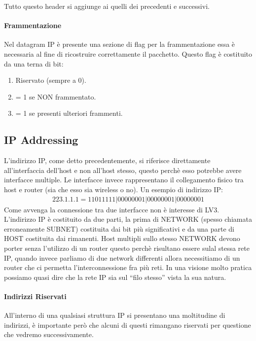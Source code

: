 \documentclass[12pt]{article}
\begin{document}
Tutto questo header si aggiunge ai quelli dei precedenti e successivi. %

\paragraph{Frammentazione} Nel datagram IP è presente una sezione di flag per la frammentazione essa è necessaria al fine di ricostruire correttamente il pacchetto. Questo flag è costituito da una terna di bit:
\begin{enumerate}
  \item Riservato (sempre a 0).
  \item = 1 se NON frammentato.
  \item = 1 se presenti ulteriori frammenti.
\end{enumerate}

\subsection{IP Addressing} %
L'indirizzo IP, come detto precedentemente, si riferisce direttamente all'interfaccia dell'host e non all'host stesso, questo perchè esso potrebbe avere interfacce multiple. Le interfacce invece rappresentano il collegamento fisico tra host e router (sia che esso sia wireless o no). Un esempio di indirizzo IP:
\begin{equation}
  \begin{gathered}
    223.1.1.1 = 11011111|00000001|00000001|00000001
    \label{eq:ipv4bit}
  \end{gathered}
\end{equation}
Come avvenga la connessione tra due interfacce non è interesse di LV3.\\
L'indirizzo IP è costituito da due parti, la prima di NETWORK (spesso chiamata erroneamente SUBNET) costituita dai bit più significativi e da una parte di HOST costituita dai rimanenti. Host multipli sullo stesso NETWORK devono porter senza l'utilizzo di un router questo perchè risultano essere sulal stessa rete IP, quando invece parliamo di due network differenti allora necessitiamo di un router che ci permetta l'interconnessione fra più reti. In una visione molto pratica possiamo quasi dire che la rete IP sia sul ``filo stesso'' vista la sua natura.
\paragraph{Indirizzi Riservati} All'interno di una qualsiasi struttura IP si presentano una moltitudine di indirizzi, è importante però che alcuni di questi rimangano riservati per questione che vedremo successivamente.
\end{document}
